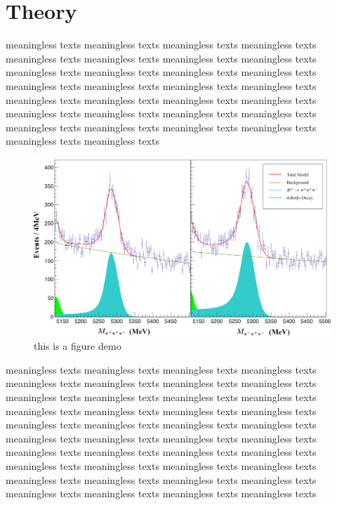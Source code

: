 \documentclass[12pt, twoside, notitlepage, twocolumn]{article}
\begin{document}
        \section{Theory}
        meaningless texts meaningless texts meaningless texts meaningless texts meaningless texts 
        meaningless texts meaningless texts meaningless texts meaningless texts meaningless texts 
        meaningless texts meaningless texts meaningless texts meaningless texts meaningless texts 
        meaningless texts meaningless texts meaningless texts meaningless texts meaningless texts 
        meaningless texts meaningless texts meaningless texts meaningless texts meaningless texts 
        meaningless texts meaningless texts meaningless texts meaningless texts meaningless texts 
        \begin{figure}[ht]
            \centering
            \includegraphics[scale=0.276]{GlobalAsy.png}
            \caption{this is a figure demo}
            \label{fig:label1}
        \end{figure}
        meaningless texts meaningless texts meaningless texts meaningless texts meaningless texts 
        meaningless texts meaningless texts meaningless texts meaningless texts meaningless texts 
        meaningless texts meaningless texts meaningless texts meaningless texts meaningless texts 
        meaningless texts meaningless texts meaningless texts meaningless texts meaningless texts 
        meaningless texts meaningless texts meaningless texts meaningless texts meaningless texts 
        meaningless texts meaningless texts meaningless texts meaningless texts meaningless texts 
        meaningless texts meaningless texts meaningless texts meaningless texts meaningless texts 
        meaningless texts meaningless texts meaningless texts meaningless texts meaningless texts 
\end{document}
